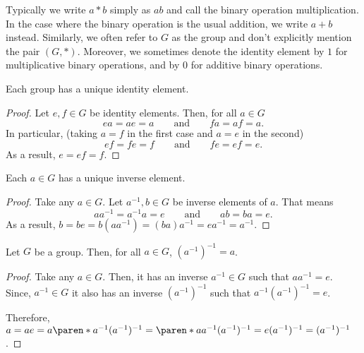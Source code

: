 \documentclass[11pt]{penrose}
\begin{document}
\begin{remark}
Typically we write $a * b$ simply as $ab$ and call the binary operation multiplication. In the case where the binary operation is the usual addition, we write $a + b$ instead. Similarly, we often refer to $G$ as the group and don't explicitly mention the pair $(G, *)$. Moreover, we sometimes denote the identity element by $1$ for multiplicative binary operations, and by $0$ for additive binary operations.
\end{remark}

\begin{nthm}
    Each group has a unique identity element.
\end{nthm}
\begin{proof}
    Let $e, f \in G$ be identity elements. Then, for all $a \in G$
    \begin{equation*}
        ea = ae = a
        \qquad\text{and}\qquad
        fa = af = a.
    \end{equation*}
    In particular, (taking $a=f$ in the first case and $a=e$ in the second)
    \begin{equation*}
        ef = fe = f
        \qquad\text{and}\qquad
        fe = ef = e.
    \end{equation*}
    As a result, $e = ef = f$.
\end{proof}

\begin{nthm}
    Each $a \in G$ has a unique inverse element.
\end{nthm}
\begin{proof}
    Take any $a \in G$. Let $a^{-1}, b \in G$ be inverse elements of $a$. That means
    \begin{equation*}
        a a^{-1} = a^{-1} a = e
        \qquad\text{and}\qquad
        a b = b a = e.
    \end{equation*}
    As a result, $b = b e = b(a a^{-1}) = (b a) a^{-1} = e a^{-1} = a^{-1}$.
\end{proof}

\begin{nthm}
    Let $G$ be a group. Then, for all $a \in G$, $(a^{-1})^{-1} = a$.
\end{nthm}
\begin{proof}
    Take any $a \in G$. Then, it has an inverse $a^{-1} \in G$ such that $a a^{-1} = e$. Since, $a^{-1} \in G$ it also has an inverse $(a^{-1})^{-1}$ such that $a^{-1} (a^{-1})^{-1} = e$.

    Therefore,
    $a = a e = a \paren*{a^{-1} (a^{-1})^{-1}} = \paren*{a a^{-1}} (a^{-1})^{-1} = e (a^{-1})^{-1} = (a^{-1})^{-1}$.
\end{proof}
\end{document}
